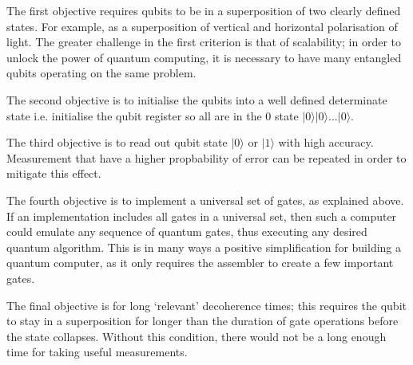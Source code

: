 The first objective requires qubits to be in a superposition of two clearly defined states. For example, as a superposition of vertical and horizontal polarisation of light. The greater challenge in the first criterion is that of scalability; in order to unlock the power of quantum computing, it is necessary to have many entangled qubits operating on the same problem.

The second objective is to initialise the qubits into a well defined determinate state i.e. initialise the qubit register so all are in the 0 state $\vert 0\rangle \vert 0\rangle$...$\vert 0 \rangle$. \cite{lapierre_divincenzo_2021}

The third objective is to read out qubit state $\vert 0\rangle$ or $\vert 1 \rangle$ with high accuracy. Measurement that have a higher propbability of error can be repeated in order to mitigate this effect.

The fourth objective is to implement a universal set of gates, as explained above. If an implementation includes all gates in a universal set, then such a computer could emulate any sequence of quantum gates, thus executing any desired  quantum algorithm. This is in many ways a positive simplification for building a quantum computer, as it only requires the assembler to create a few important gates. 

The final objective is for long `relevant' decoherence times; this requires the qubit to stay in a superposition for longer than the duration of gate operations before the state collapses. Without this condition, there would not be a long enough time for taking useful measurements.